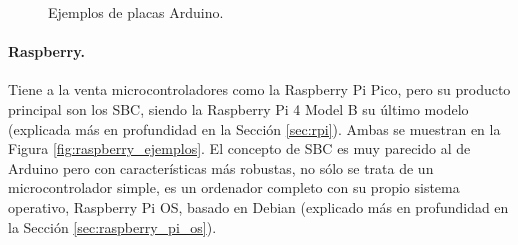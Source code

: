 \begin{figure}[h!]
  \begin{center}
    \subcapcentertrue
    \hspace{1cm}
  \end{center}
\caption{Ejemplos de placas Arduino.}
\label{fig:arduino_ejemplos}
\end{figure}

\paragraph{Raspberry.} Tiene a la venta microcontroladores como la Raspberry Pi Pico, pero su producto principal son los SBC, siendo la Raspberry Pi 4 Model B su último modelo (explicada más en profundidad en la Sección \ref{sec:rpi}). Ambas se muestran en la Figura \ref{fig:raspberry_ejemplos}. El concepto de SBC es muy parecido al de Arduino pero con características más robustas, no sólo se trata de un microcontrolador simple, es un ordenador completo con su propio sistema operativo, Raspberry Pi OS, basado en Debian (explicado más en profundidad en la Sección \ref{sec:raspberry_pi_os}). \\


